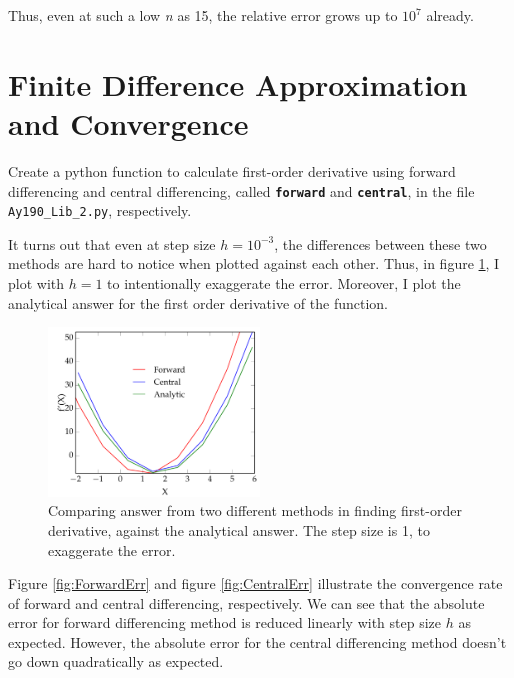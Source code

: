 \documentclass[11pt,letterpaper]{article}
\begin{document}
Thus, even at such a low \emph{n} as 15, the relative error grows up to $10^7$ already.


\section{Finite Difference Approximation and Convergence}
Create a python function to calculate first-order derivative using forward differencing and central differencing, called
\texttt{\bf forward} and \texttt{\bf central}, in the file \texttt{Ay190\_Lib\_2.py}, respectively.

It turns out that even at step size $h=10^{-3}$, the differences between these two methods are hard to notice when plotted against each other.
Thus, in figure \ref{fig:DiffMethod}, I plot with $h=1$ to intentionally exaggerate the error. Moreover, I plot the analytical answer for the first
order derivative of the function.

\begin{figure}[h!]
	\centering
	\includegraphics[width=0.5\textwidth]{CompareMethods}
	\caption{Comparing answer from two different methods in finding first-order derivative, against the analytical answer. The step size is 1, 
	to exaggerate the error.}
	\label{fig:DiffMethod}
\end{figure}

Figure \ref{fig:ForwardErr} and figure \ref{fig:CentralErr} illustrate the convergence rate of forward and central differencing, respectively.
We can see that the absolute error for forward differencing method is reduced linearly with step size $h$ as expected. However, the absolute
error for the central differencing method doesn't go down quadratically as expected.
\end{document}
